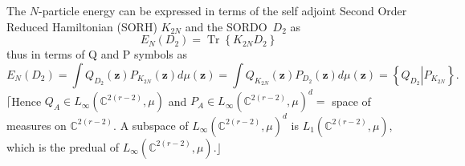 \documentclass[aps,preprint]{revtex4}%
\begin{document}
The $N$-particle energy can be expressed in terms of the self adjoint Second
Order Reduced Hamiltonian (SORH) $K_{2N}$ and the SORDO\ $D_{2}$
\cite{Colemann} as
\begin{equation}
E_{N}\left(  D_{2}\right)  =\operatorname*{Tr}\left\{  K_{2N}D_{2}\right\}
\end{equation}
thus in terms of Q and P symbols as
\begin{equation}
E_{N}\left(  D_{2}\right)  =\int Q_{D_{2}}\left(  \mathbf{z}\right)
P_{K_{2N}}\left(  \mathbf{z}\right)  d\mu\left(  \mathbf{z}\right)  =\int
Q_{K_{2N}}\left(  \mathbf{z}\right)  P_{D_{2}}\left(  \mathbf{z}\right)
d\mu\left(  \mathbf{z}\right)  =\left\{  \left.  Q_{D_{2}}\right\vert
P_{K_{2N}}\right\}  .
\end{equation}
$\lceil$Hence $Q_{A}\mathbf{\in}L_{\infty}\left(  \mathbb{C}^{2\left(
r-2\right)  },\mu\right)  $ and $P_{A}\mathbf{\in}L_{\infty}\left(
\mathbb{C}^{2\left(  r-2\right)  },\mu\right)  ^{d}=$ space of measures on
$\mathbb{C}^{2\left(  r-2\right)  }.$ A subspace of $L_{\infty}\left(
\mathbb{C}^{2\left(  r-2\right)  },\mu\right)  ^{d}$ is $L_{1}\left(
\mathbb{C}^{2\left(  r-2\right)  },\mu\right)  $, which is the predual of
$L_{\infty}\left(  \mathbb{C}^{2\left(  r-2\right)  },\mu\right)  .\rfloor$
\end{document}
